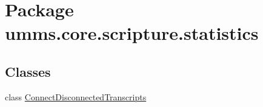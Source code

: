 \hypertarget{namespaceumms_1_1core_1_1scripture_1_1statistics}{\section{Package umms.\+core.\+scripture.\+statistics}
\label{namespaceumms_1_1core_1_1scripture_1_1statistics}
}
\subsection*{Classes}
\begin{DoxyCompactItemize}
\item 
class \hyperlink{classumms_1_1core_1_1scripture_1_1statistics_1_1_connect_disconnected_transcripts}{Connect\+Disconnected\+Transcripts}
\end{DoxyCompactItemize}
